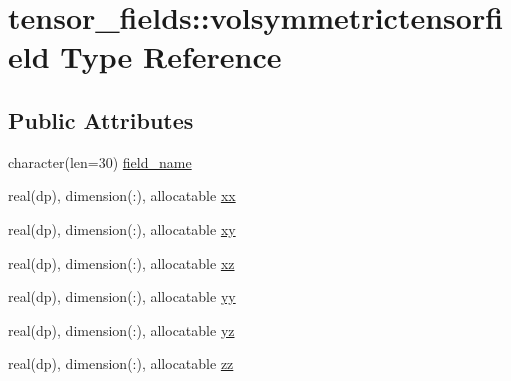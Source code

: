 \hypertarget{structtensor__fields_1_1volsymmetrictensorfield}{\section{tensor\-\_\-fields\-:\-:volsymmetrictensorfield Type Reference}
\label{structtensor__fields_1_1volsymmetrictensorfield}
}
\subsection*{Public Attributes}
\begin{DoxyCompactItemize}
\item 
character(len=30) \hyperlink{structtensor__fields_1_1volsymmetrictensorfield_a4cb8f5abf82bc3c677309492a7caf4a8}{field\-\_\-name}
\item 
real(dp), dimension(\-:), allocatable \hyperlink{structtensor__fields_1_1volsymmetrictensorfield_a7f12df8006b80670a00787a85cf6abd0}{xx}
\item 
real(dp), dimension(\-:), allocatable \hyperlink{structtensor__fields_1_1volsymmetrictensorfield_abd016b0ab1652f8e3ae3197a2ec4f81f}{xy}
\item 
real(dp), dimension(\-:), allocatable \hyperlink{structtensor__fields_1_1volsymmetrictensorfield_aa92ad13ff22457f916d2bfb25fad0716}{xz}
\item 
real(dp), dimension(\-:), allocatable \hyperlink{structtensor__fields_1_1volsymmetrictensorfield_a98f92f6c0d5a0e8f32ffd0f4de662e57}{yy}
\item 
real(dp), dimension(\-:), allocatable \hyperlink{structtensor__fields_1_1volsymmetrictensorfield_a717f4d4ef254e9f556349e03fd65b94d}{yz}
\item 
real(dp), dimension(\-:), allocatable \hyperlink{structtensor__fields_1_1volsymmetrictensorfield_a642d025aeabf20d8cb7890e5d6b6d813}{zz}
\end{DoxyCompactItemize}


